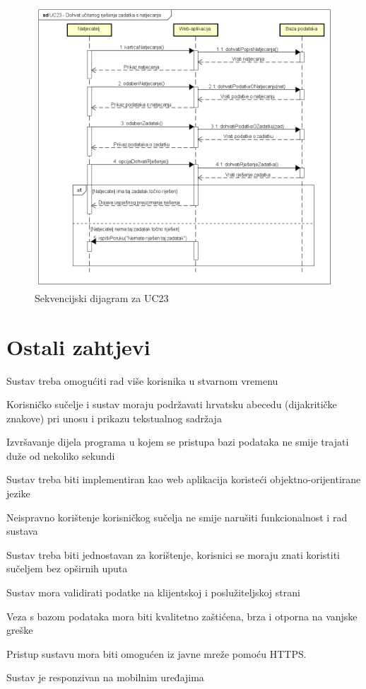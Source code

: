 				\begin{figure}[H]
					\includegraphics[width=\textwidth]{slike/SEQ_UC23.PNG}
					\caption{Sekvencijski dijagram za UC23}
					\label{fig:seq_uc23}
				\end{figure}
		\eject
	
		\section{Ostali zahtjevi}
		
		\begin{packed_item}
			\item Sustav treba omogućiti rad više korisnika u stvarnom vremenu
			 \item Korisničko sučelje i sustav moraju podržavati hrvatsku abecedu (dijakritičke znakove) pri unosu i prikazu tekstualnog sadržaja
			\item Izvršavanje dijela programa u kojem se pristupa bazi podataka ne smije trajati duže od nekoliko sekundi
			\item Sustav treba biti implementiran kao web aplikacija koristeći objektno-orijentirane jezike
			\item Neispravno korištenje korisničkog sučelja ne smije narušiti funkcionalnost i rad sustava
			\item Sustav treba biti jednostavan za korištenje, korisnici se moraju znati koristiti sučeljem bez opširnih uputa
			\item Sustav mora validirati podatke na klijentskoj i poslužiteljskoj strani
			\item Veza s bazom podataka mora biti kvalitetno zaštićena, brza i otporna na vanjske greške
			\item Pristup sustavu mora biti omogućen iz javne mreže pomoću HTTPS.
			\item Sustav je responzivan na mobilnim uređajima 
		\end{packed_item}	
			 
			 
			 
	